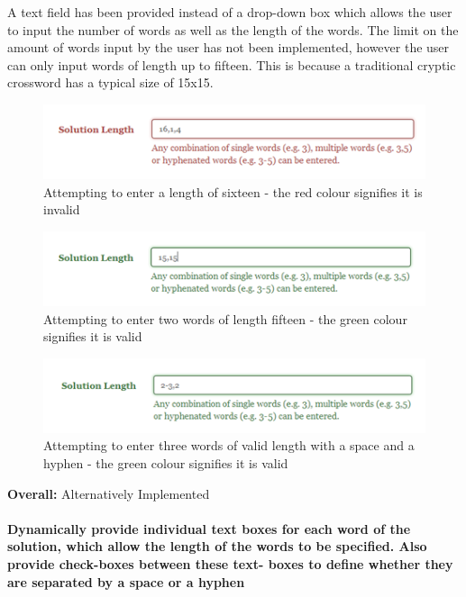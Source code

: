  A text field has been provided instead of a drop-down box which allows the user
 to input the number of words as well as the length of the words. The limit on the 
amount of words input by the user has not been implemented, however the user 
can only input words of length up to fifteen. This is because a traditional cryptic 
crossword has a typical size of 15x15.

\begin{figure}[H]
	\centering
	\includegraphics[keepaspectratio=true]{evidence/dropdown1.png}
	\caption{Attempting to enter a length of sixteen - the red colour signifies it is invalid}
\end{figure}

\begin{figure}[H]
	\centering
	\includegraphics[keepaspectratio=true]{evidence/dropdown2.png}
	\caption{Attempting to enter two words of length fifteen - the green colour signifies it is valid}
\end{figure}

\begin{figure}[H]
	\centering
	\includegraphics[keepaspectratio=true]{evidence/dropdown3.png}
	\caption{Attempting to enter three words of valid length with a space and a hyphen - the green 
colour signifies it is valid}
\end{figure}

{\bf Overall:} Alternatively Implemented

\paragraph{Dynamically provide individual text boxes for each word
of the solution, which allow the length of the words to be
specified. Also provide check-boxes between these text-
boxes to define whether they are separated by a space
or a hyphen}

